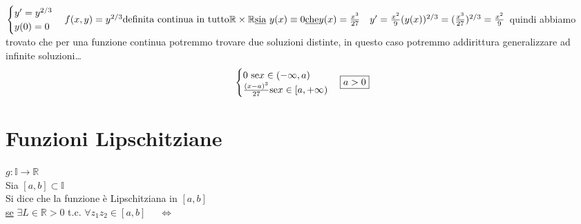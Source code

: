 \documentclass[a4paper, oneside]{article}
\begin{document}
\begin{example}
    $
        \begin{cases}
            y' = y^{2/3}\\
            y(0) = 0
        \end{cases}
        \\f(x,y) = y^{2/3} \text{definita continua in tutto} \mathbb{R} \times \mathbb{R}
        \\\text{\underbar{sia} } y(x) \equiv 0
        \\\text{\underbar{che}} y(x) = \frac{x^3}{27} \quad y' = \frac{x^2}{9} (y(x))^{2/3}=(\frac{x^3}{27})^{2/3} = \frac{x^2}{9}
    $
    quindi abbiamo trovato che per una funzione continua potremmo trovare due soluzioni distinte, in questo caso potremmo addirittura generalizzare ad infinite soluzioni\dots\\
    \begin{align*}
    \begin{cases}
        0 \ \text{se} x \in (-\infty, a)\\
        \frac{(x-a)^3}{27} \text{se} x \in [a, +\infty)\\
    \end{cases}
\text{\fbox{$a > 0$}}    
    \end{align*}
    
    

\end{example}

\section{Funzioni Lipschitziane}
$g: \mathbb{I} \to \mathbb{R}$
\\Sia $[a,b] \subset \mathbb{I}$
\\Si dice che la funzione è Lipschitziana in $[a,b]$ 
\\\underline{se} $\exists L\in\mathbb{R} >0$ t.c. $\forall z_1 z_2 \in [a,b]$  $\quad \Longleftrightarrow  \quad \ $
\end{document}
